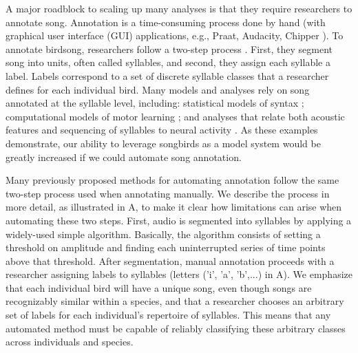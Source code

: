 \documentclass[9pt,lineno]{elife}
\begin{document}
A major roadblock to scaling up many analyses is that they require researchers to annotate song. 
Annotation is a time-consuming process done by hand 
(with graphical user interface (GUI) applications, e.g., Praat, Audacity, Chipper \citep{paulboersmaPraatDoingPhonetics2021,audacityteamAudacity2019,searfoss2020chipper}). 
To annotate birdsong, researchers follow a two-step process
\citep{thompson1994system,kershenbaumAcousticSequencesNonhuman2016}. 
First, they segment song into units, often called syllables, 
and second, they assign each syllable a label.
Labels correspond to a set of discrete syllable classes that a researcher defines for each individual bird. 
Many models and analyses rely on song annotated at the syllable level, including: 
statistical models of syntax
\citep{markowitz_long-range_2013,jin2011compact,berwick2011songs,hedley2016complexity}; 
computational models of motor learning 
\citep{sober2009adult,sober2012vocal};  
and analyses that relate both acoustic features and sequencing of syllables to neural activity 
\citep{leonardoEnsembleCodingVocal2005,soberCentralContributionsAcoustic2008,wohlgemuth_linked_2010}. 
As these examples demonstrate, 
our ability to leverage songbirds as a model system 
would be greatly increased if we could automate 
song annotation.

Many previously proposed methods for automating annotation follow the same two-step process 
used when annotating manually.
We describe the process in more detail, as illustrated in A, 
to make it clear how limitations can arise when automating these two steps. 
First, audio is segmented into syllables by applying 
a widely-used simple algorithm.
Basically, the algorithm consists of setting a threshold on amplitude  
and finding each uninterrupted series of time points above that threshold.  
After segmentation, 
manual annotation proceeds with a researcher assigning 
labels to syllables (letters ('i', 'a', 'b',...) in A).
We emphasize that each individual bird will have a unique song, even though 
songs are recognizably similar within a species, 
and that a researcher chooses an arbitrary set of labels for each individual's repertoire of syllables. 
This means that any automated method must be capable of reliably classifying 
these arbitrary classes across individuals and species.
\end{document}
